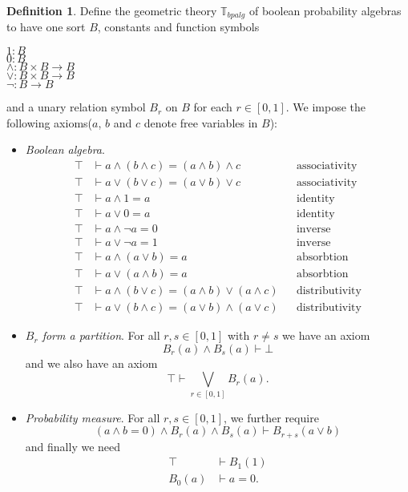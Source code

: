 \documentclass[a4paper]{amsproc}
\theoremstyle{plain}
\theoremstyle{definition}
\newtheorem{definition}[theorem]{Definition}
\theoremstyle{remark}
\numberwithin{equation}{section}
\begin{document}
\begin{definition}
Define the geometric theory $\mathbb{T}_{bpalg}$ of boolean probability algebras to have one sort $B$, constants and function symbols
\begin{center}
$1: B$ \\
$0: B$ \\
$\wedge: B \times B \to B$ \\
$\vee: B \times B \to B$ \\
$\neg: B \to B$
\end{center}
and a unary relation symbol $B_r$ on $B$ for each $r \in [0,1]$. We impose the following axioms($a$, $b$ and $c$ denote free variables in $B$):
\begin{itemize}
\item \textit{Boolean algebra}.
\begin{align*}
\top &\vdash a \wedge (b \wedge c) = (a \wedge b) \wedge c && \text{associativity} \\
\top &\vdash a \vee (b \vee c) = (a \vee b) \vee c && \text{associativity} \\
\top &\vdash a \wedge 1 = a && \text{identity} \\
\top &\vdash a \vee 0 = a && \text{identity}\\
\top &\vdash a \wedge \neg{a} = 0 && \text{inverse}\\
\top &\vdash a \vee \neg{a} = 1 && \text{inverse}\\
\top &\vdash a \wedge (a \vee b) = a && \text{absorbtion}\\
\top &\vdash a \vee (a \wedge b) = a && \text{absorbtion}\\
\top &\vdash a \wedge (b \vee c) = (a \wedge b) \vee (a \wedge c) && \text{distributivity} \\
\top &\vdash a \vee (b \wedge c) = (a \vee b) \wedge (a \vee c) && \text{distributivity}
\end{align*}
\item \textit{$B_r$ form a partition}. For all $r, s \in [0,1]$ with $r \neq s$ we have an axiom
\[
B_r(a)  \wedge B_s(a) \vdash \bot
\]
and we also have an axiom
\[
\top \vdash \bigvee_{r \in [0,1]} B_r(a).
\]
\item \textit{Probability measure}. For all $r, s \in [0,1]$, we further require
\[
(a \wedge b = 0) \wedge B_r(a) \wedge B_s(a) \vdash B_{r+s}(a \vee b) 
\]
and finally we need
\begin{align*}
\top & \vdash B_1(1) \\
B_0(a) & \vdash a = 0.
\end{align*}
\end{itemize}
\end{definition}
\end{document}
